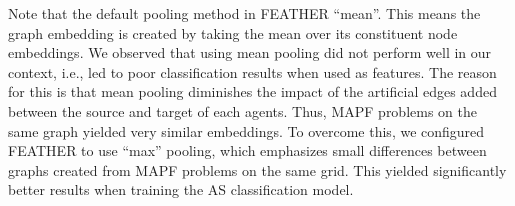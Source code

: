 \documentclass{ecai}
\newcommand{\Carmel}[1]{}
\newcommand{\Roni}[1]{}
\begin{document}
Note that the default pooling method in FEATHER ``mean''. 
This means the graph embedding is created by taking the mean over its constituent node embeddings.
We observed that using mean pooling did not perform well in our context, i.e., led to poor classification results when used as features. 
The reason for this is that mean pooling diminishes the impact of the artificial edges added between the source and target of each agents. Thus, MAPF problems on the same graph yielded very similar embeddings. 
To overcome this, we configured FEATHER to use ``max'' pooling, which emphasizes small differences between graphs created from MAPF problems on the same grid. This yielded significantly better results when  training the AS classification model. 









\end{document}
